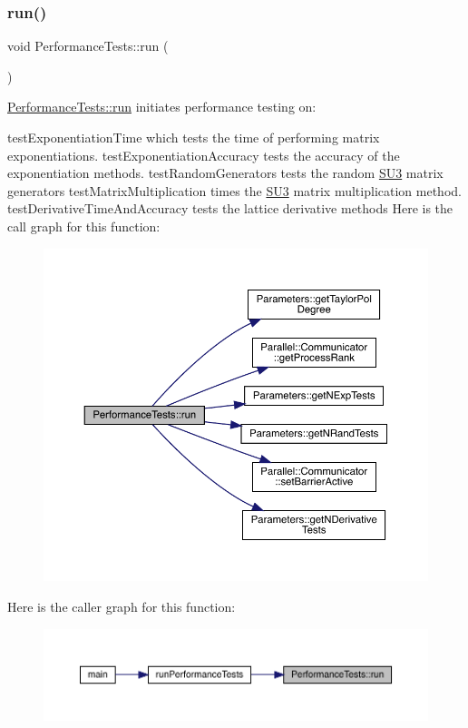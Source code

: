 \subsubsection{\texorpdfstring{run()}{run()}}
{\footnotesize\ttfamily void Performance\+Tests\+::run (\begin{DoxyParamCaption}{ }\end{DoxyParamCaption})}



\mbox{\hyperlink{class_performance_tests_aa55ebdbc84db93cc45adfdf7163f90b4}{Performance\+Tests\+::run}} initiates performance testing on\+: 

test\+Exponentiation\+Time which tests the time of performing matrix exponentiations. test\+Exponentiation\+Accuracy tests the accuracy of the exponentiation methods. test\+Random\+Generators tests the random \mbox{\hyperlink{class_s_u3}{S\+U3}} matrix generators test\+Matrix\+Multiplication times the \mbox{\hyperlink{class_s_u3}{S\+U3}} matrix multiplication method. test\+Derivative\+Time\+And\+Accuracy tests the lattice derivative methods Here is the call graph for this function\+:
\nopagebreak
\begin{figure}[H]
\begin{center}
\leavevmode
\includegraphics[width=350pt]{class_performance_tests_aa55ebdbc84db93cc45adfdf7163f90b4_cgraph}
\end{center}
\end{figure}
Here is the caller graph for this function\+:
\nopagebreak
\begin{figure}[H]
\begin{center}
\leavevmode
\includegraphics[width=350pt]{class_performance_tests_aa55ebdbc84db93cc45adfdf7163f90b4_icgraph}
\end{center}
\end{figure}


